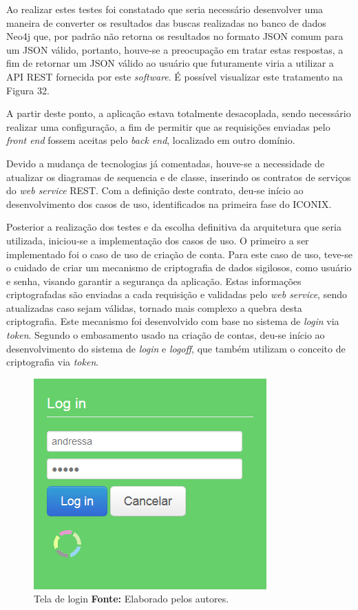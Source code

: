 \par Ao realizar estes testes foi constatado que seria necessário desenvolver uma maneira de converter os resultados das buscas realizadas no banco de dados Neo4j que, por padrão não retorna os resultados no formato JSON comum para um JSON válido, portanto, houve-se a preocupação em tratar estas respostas, a fim de retornar um JSON válido ao usuário que futuramente viria a utilizar a API REST fornecida por este \textit{software}. É possível visualizar este tratamento na Figura 32. 
 
\par A partir deste ponto, a aplicação estava totalmente desacoplada, sendo necessário realizar uma configuração, a fim de permitir que as requisições enviadas pelo \textit{front end} fossem aceitas pelo \textit{back end}, localizado em outro domínio.

\par Devido a mudança de tecnologias já comentadas, houve-se a necessidade de atualizar os diagramas de sequencia e de classe, inserindo os contratos de serviços do \textit{web service} REST. Com a definição deste contrato, deu-se início ao desenvolvimento dos casos de uso, identificados na primeira fase do ICONIX. 

\par Posterior a realização dos testes e da escolha definitiva da arquitetura que seria utilizada, iniciou-se a implementação dos casos de uso. O primeiro a ser implementado foi o caso de uso de criação de conta. Para este caso de uso, teve-se o cuidado de criar um mecanismo de criptografia de dados sigilosos, como usuário e senha, visando garantir a segurança da aplicação. Estas informações criptografadas são enviadas a cada requisição e validadas pelo \textit{web service}, sendo atualizadas caso sejam válidas, tornado mais complexo a quebra desta criptografia. Este mecanismo foi desenvolvido com base no sistema de \textit{login} via \textit{token}. Segundo o embasamento usado na criação de contas, deu-se início ao desenvolvimento do sistema de \textit{login} e \textit{logoff}, que também utilizam o conceito de criptografia via \textit{token}. 

\begin{figure}[h!]
	\centerline{\includegraphics[scale=0.60]{./imagens/login.jpg}}
	\caption[Tela de login ]
	{Tela de login \textbf{Fonte:} Elaborado pelos autores.}
	\label{fig:exemplo1}
\end{figure}

